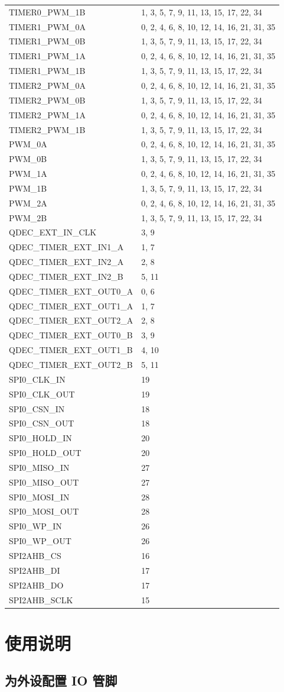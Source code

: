 \documentclass[
  12pt,
]{book}
\begin{document}
\begin{longtable}[]{@{}ll@{}}
TIMER0\_PWM\_1B & 1, 3, 5, 7, 9, 11, 13, 15, 17, 22, 34\tabularnewline
TIMER1\_PWM\_0A & 0, 2, 4, 6, 8, 10, 12, 14, 16, 21, 31, 35\tabularnewline
TIMER1\_PWM\_0B & 1, 3, 5, 7, 9, 11, 13, 15, 17, 22, 34\tabularnewline
TIMER1\_PWM\_1A & 0, 2, 4, 6, 8, 10, 12, 14, 16, 21, 31, 35\tabularnewline
TIMER1\_PWM\_1B & 1, 3, 5, 7, 9, 11, 13, 15, 17, 22, 34\tabularnewline
TIMER2\_PWM\_0A & 0, 2, 4, 6, 8, 10, 12, 14, 16, 21, 31, 35\tabularnewline
TIMER2\_PWM\_0B & 1, 3, 5, 7, 9, 11, 13, 15, 17, 22, 34\tabularnewline
TIMER2\_PWM\_1A & 0, 2, 4, 6, 8, 10, 12, 14, 16, 21, 31, 35\tabularnewline
TIMER2\_PWM\_1B & 1, 3, 5, 7, 9, 11, 13, 15, 17, 22, 34\tabularnewline
PWM\_0A & 0, 2, 4, 6, 8, 10, 12, 14, 16, 21, 31, 35\tabularnewline
PWM\_0B & 1, 3, 5, 7, 9, 11, 13, 15, 17, 22, 34\tabularnewline
PWM\_1A & 0, 2, 4, 6, 8, 10, 12, 14, 16, 21, 31, 35\tabularnewline
PWM\_1B & 1, 3, 5, 7, 9, 11, 13, 15, 17, 22, 34\tabularnewline
PWM\_2A & 0, 2, 4, 6, 8, 10, 12, 14, 16, 21, 31, 35\tabularnewline
PWM\_2B & 1, 3, 5, 7, 9, 11, 13, 15, 17, 22, 34\tabularnewline
QDEC\_EXT\_IN\_CLK & 3, 9\tabularnewline
QDEC\_TIMER\_EXT\_IN1\_A & 1, 7\tabularnewline
QDEC\_TIMER\_EXT\_IN2\_A & 2, 8\tabularnewline
QDEC\_TIMER\_EXT\_IN2\_B & 5, 11\tabularnewline
QDEC\_TIMER\_EXT\_OUT0\_A & 0, 6\tabularnewline
QDEC\_TIMER\_EXT\_OUT1\_A & 1, 7\tabularnewline
QDEC\_TIMER\_EXT\_OUT2\_A & 2, 8\tabularnewline
QDEC\_TIMER\_EXT\_OUT0\_B & 3, 9\tabularnewline
QDEC\_TIMER\_EXT\_OUT1\_B & 4, 10\tabularnewline
QDEC\_TIMER\_EXT\_OUT2\_B & 5, 11\tabularnewline
SPI0\_CLK\_IN & 19\tabularnewline
SPI0\_CLK\_OUT & 19\tabularnewline
SPI0\_CSN\_IN & 18\tabularnewline
SPI0\_CSN\_OUT & 18\tabularnewline
SPI0\_HOLD\_IN & 20\tabularnewline
SPI0\_HOLD\_OUT & 20\tabularnewline
SPI0\_MISO\_IN & 27\tabularnewline
SPI0\_MISO\_OUT & 27\tabularnewline
SPI0\_MOSI\_IN & 28\tabularnewline
SPI0\_MOSI\_OUT & 28\tabularnewline
SPI0\_WP\_IN & 26\tabularnewline
SPI0\_WP\_OUT & 26\tabularnewline
SPI2AHB\_CS & 16\tabularnewline
SPI2AHB\_DI & 17\tabularnewline
SPI2AHB\_DO & 17\tabularnewline
SPI2AHB\_SCLK & 15\tabularnewline
\bottomrule
\end{longtable}

\hypertarget{ux4f7fux7528ux8bf4ux660e-4}{%
\section{使用说明}\label{ux4f7fux7528ux8bf4ux660e-4}}

\hypertarget{ux4e3aux5916ux8bbeux914dux7f6e-io-ux7ba1ux811a}{%
\subsection{为外设配置 IO 管脚}\label{ux4e3aux5916ux8bbeux914dux7f6e-io-ux7ba1ux811a}}
\end{document}

